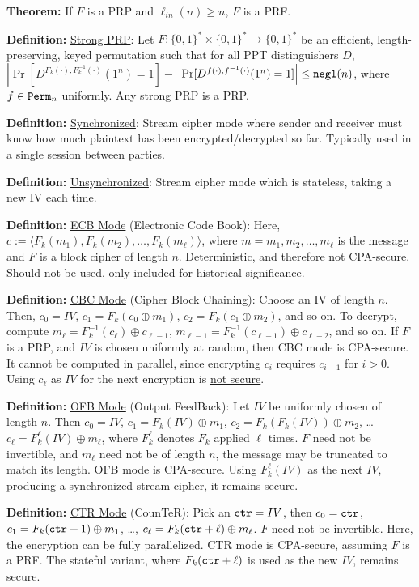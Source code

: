 \documentclass[12pt]{article}
\newcommand{\defn}[1]{{\bf Definition:} \underline{#1}}
\newcommand{\thm}[1]{{\bf Theorem:} \underline{#1}}
\newcommand{\ang}[1]{\langle#1\rangle}
\newcommand{\xor}{\oplus}
\newcommand{\negl}{{\tt negl}}
\newcommand{\ctr}{{\tt ctr}}
\begin{document}
\begin{multicols}{3}
\thm{} If $F$ is a PRP and $\ell_{in}(n)\geq n$, $F$ is a PRF.

\defn{Strong PRP}: Let $F:\{0,1\}^*\times\{0,1\}^*\to\{0,1\}^*$ be an efficient, length-preserving, keyed permutation such that for all PPT distinguishers $D$, $\left|\Pr[D^{F_k(\cdot),F_k^{-1}(\cdot)}(1^n)=1]-\right.$ $\left.\Pr[D^{f(\cdot),f^{-1}(\cdot)}(1^n)=1]\right|\leq\negl(n)$, where $f\in{\tt Perm}_n$ uniformly. Any strong PRP is a PRP.

\defn{Synchronized}: Stream cipher mode where sender and receiver must know how much plaintext has been encrypted/decrypted so far. Typically used in a single session between parties.

\defn{Unsynchronized}: Stream cipher mode which is stateless, taking a new IV each time.

\defn{ECB Mode} (Electronic Code Book): Here, $c:=\ang{F_k(m_1),F_k(m_2),\dots,F_k(m_\ell)}$, where $m=m_1,m_2,\dots,m_\ell$ is the message and $F$ is a block cipher of length $n$. Deterministic, and therefore not CPA-secure. Should not be used, only included for historical significance.

\defn{CBC Mode} (Cipher Block Chaining): Choose an IV of length $n$. Then, $c_0=IV$, $c_1=F_k(c_0\xor m_1)$, $c_2=F_k(c_1\xor m_2)$, and so on. To decrypt, compute $m_\ell=F^{-1}_k(c_\ell)\xor c_{\ell-1}$, $m_{\ell-1}=F_k^{-1}(c_{\ell-1})\xor c_{\ell-2}$, and so on. If $F$ is a PRP, and $IV$ is chosen uniformly at random, then CBC mode is CPA-secure. It cannot be computed in parallel, since encrypting $c_i$ requires $c_{i-1}$ for $i>0$. Using $c_\ell$ as $IV$ for the next encryption is \underline{not secure}.

\defn{OFB Mode} (Output FeedBack): Let $IV$ be uniformly chosen of length $n$. Then $c_0=IV$, $c_1=F_k(IV)\xor m_1$, $c_2=F_k(F_k(IV))\xor m_2$, \dots $c_\ell=F_k^\ell(IV)\xor m_\ell$, where $F_k^\ell$ denotes $F_k$ applied $\ell$ times. $F$ need not be invertible, and $m_\ell$ need not be of length $n$, the message may be truncated to match its length. OFB mode is CPA-secure. Using $F_k^{\ell}(IV)$ as the next $IV$, producing a synchronized stream cipher, it remains secure.

\defn{CTR Mode} (CounTeR): Pick an $\ctr=IV$, then $c_0=\ctr$, $c_1=F_k(\ctr+1)\xor m_1$, \dots, $c_\ell=F_k(\ctr+\ell)\xor m_\ell$. $F$ need not be invertible. Here, the encryption can be fully parallelized. CTR mode is CPA-secure, assuming $F$ is a PRF. The stateful variant, where $F_k(\ctr+\ell)$ is used as the new $IV$, remains secure.


\end{multicols}
\end{document}
